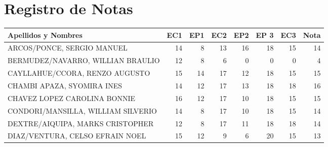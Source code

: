 \chapter{Registro de Notas}
\newpage

\begin{table}[]
	\begin{tabular}{lrrrrrrr}
		\hline
		Apellidos y Nombres                 & EC1 & EP1 & EC2 & EP2 & EP 3 & EC3 & Nota \\ \hline
		ARCOS/PONCE, SERGIO MANUEL          & 14                      & 8                       & 13                      & 16                      & 18                       & 15                      & 14                       \\
		BERMUDEZ/NAVARRO, WILLIAN BRAULIO   & 12                      & 8                       & 6                       & 0    & 0                        & 0                       & 4                        \\
		CAYLLAHUE/CCORA, RENZO AUGUSTO      & 15                      & 14                      & 17                      & 12                      & 18                       & 15                      & 15                       \\
		CHAMBI APAZA, SYOMIRA INES          & 14                      & 12                      & 17                      & 13                      & 18                       & 18                      & 16                       \\
		CHAVEZ LOPEZ CAROLINA BONNIE        & 16                      & 12                      & 17                      & 10                      & 18                       & 15                      & 15                       \\
		CONDORI/MANSILLA, WILLIAM SILVERIO  & 14                      & 8                       & 17                      & 10                      & 18                       & 15                      & 14                       \\
		DEXTRE/AIQUIPA, MARKS CRISTOPHER    & 12                      & 8                       & 17                      & 11                      & 18                       & 18                      & 14                       \\
		DIAZ/VENTURA, CELSO EFRAIN NOEL     & 15                      & 12                      & 9                       & 6                       & 20                       & 15                      & 13                       \\

\end{tabular}
\end{table}
